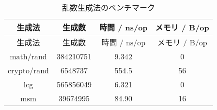 
\begin{longtable}{|c|c|c|c|}
	\caption{乱数生成法のベンチマーク}\label{tab:random-bench}    \\
	\hline
	生成法         & 生成数       & 時間 / ns/op & メモリ / B/op \\
	\hline
	\endfirsthead

	\hline
	生成法         & 生成数       & 時間 / ns/op & メモリ / B/op \\
	\hline
	\endhead

	\hline
	\endfoot

	\hline
	\endlastfoot

	math/rand   & 384210751 & 9.342      & 0          \\
	crypto/rand & 6548737   & 554.5      & 56         \\
	lcg         & 565856049 & 6.321      & 0          \\
	msm         & 39674995  & 84.90      & 16         \\
\end{longtable}
